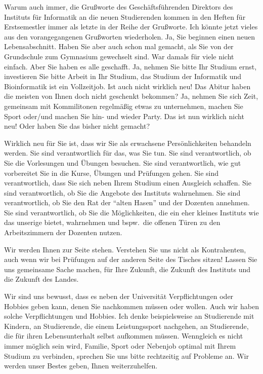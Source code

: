 Warum auch immer, die Grußworte des Geschäftsführenden Direktors des Instituts
für Informatik an die neuen Studierenden kommen in den Heften für Erstsemestler
immer als letzte in der Reihe der Grußworte. Ich könnte jetzt vieles aus den
vorangegangenen Grußworten wiederholen. Ja, Sie beginnen einen neuen
Lebensabschnitt. Haben Sie aber auch schon mal  gemacht, als Sie von der
Grundschule zum Gymnasium gewechselt sind. War damals für viele nicht einfach.
Aber Sie haben es alle geschafft. Ja, nehmen Sie bitte Ihr Studium ernst,
investieren Sie bitte Arbeit in Ihr Studium, das Studium der Informatik und
Bioinformatik ist ein Vollzeitjob. Ist auch nicht wirklich neu! Das Abitur haben
die meisten von Ihnen doch nicht geschenkt bekommen? Ja, nehmen Sie sich Zeit,
gemeinsam mit Kommilitonen regelmäßig etwas zu unternehmen, machen Sie Sport
oder/und machen Sie hin- und wieder Party. Das ist nun wirklich nicht neu! Oder
haben Sie das bisher nicht gemacht?

Wirklich neu für Sie ist, dass wir Sie als erwachsene Persönlichkeiten behandeln
werden. Sie sind verantwortlich für das, was Sie tun. Sie sind verantwortlich,
ob Sie die Vorlesungen und Übungen besuchen. Sie sind verantwortlich, wie gut
vorbereitet Sie in die Kurse, Übungen und Prüfungen gehen. Sie sind
verantwortlich, dass Sie sich neben Ihrem Studium einen Ausgleich schaffen. Sie
sind verantwortlich, ob Sie die Angebote des Instituts wahrnehmen. Sie sind
verantwortlich, ob Sie den Rat der \enquote{alten Hasen} und der Dozenten annehmen. Sie
sind verantwortlich, ob Sie die Möglichkeiten, die ein eher kleines Instituts
wie das unserige bietet, wahrnehmen und bspw.\ die offenen Türen zu den
Arbeitszimmern der Dozenten nutzen.

Wir werden Ihnen zur Seite stehen. Verstehen Sie uns nicht als Kontrahenten,
auch wenn wir bei Prüfungen auf der anderen Seite des Tisches sitzen! Lassen Sie
uns gemeinsame Sache machen, für Ihre Zukunft, die Zukunft des Instituts und die
Zukunft des Landes.

Wir sind uns bewusst, dass es neben der Universität Verpflichtungen oder Hobbies
geben kann, denen Sie nachkommen müssen oder wollen. Auch wir haben solche
Verpflichtungen und Hobbies. Ich denke beispielsweise an Studierende mit
Kindern, an Studierende, die einem Leistungssport nachgehen, an Studierende, die
für  ihren Lebensunterhalt selbst aufkommen müssen. Wenngleich es nicht immer
möglich sein wird, Familie, Sport oder Nebenjob optimal mit Ihrem Studium zu
verbinden, sprechen Sie uns bitte rechtzeitig auf Probleme an. Wir werden unser
Bestes geben, Ihnen weiterzuhelfen.

